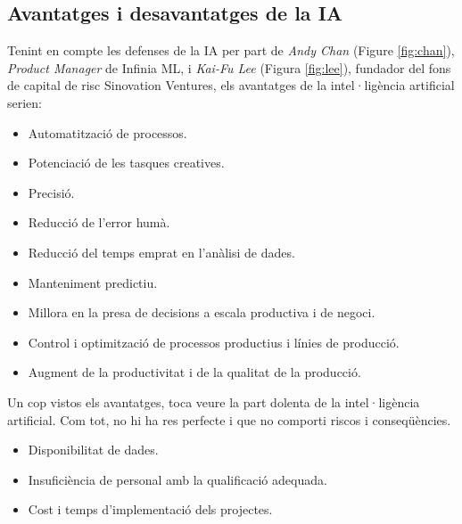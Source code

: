 \documentclass[a4paper,12pt]{article}
\begin{document}
\subsection*{Avantatges i desavantatges de la IA}
Tenint en compte les defenses de la IA per part de \textit{Andy Chan} (Figure \ref{fig:chan}), \textit{Product Manager} de Infinia ML, i \textit{Kai-Fu Lee} (Figura \ref{fig:lee}), fundador del fons de capital de risc Sinovation Ventures, els avantatges de la intel·ligència artificial serien:
\begin{itemize}
    \item Automatització de processos.
    \item Potenciació de les tasques creatives.
    \item Precisió.
    \item Reducció de l'error humà.
    \item Reducció del temps emprat en l'anàlisi de dades.
    \item Manteniment predictiu.
    \item Millora en la presa de decisions a escala productiva i de negoci.
    \item Control i optimització de processos productius i línies de producció.
    \item Augment de la productivitat i de la qualitat de la producció.
\end{itemize}
Un cop vistos els avantatges, toca veure la part dolenta de la intel·ligència artificial. Com tot, no hi ha res perfecte i que no comporti riscos i conseqüències.
\begin{itemize}
    \item Disponibilitat de dades.
    \item Insuficiència de personal amb la qualificació adequada.
    \item Cost i temps d'implementació dels projectes.
\end{itemize}
\end{document}
